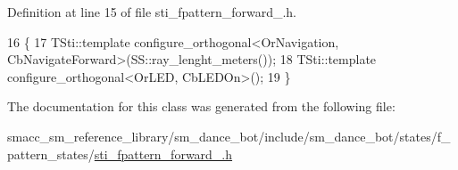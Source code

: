 Definition at line 15 of file sti\+\_\+fpattern\+\_\+forward\+\_.\+h.


\begin{DoxyCode}
16   \{
17      TSti::template configure\_orthogonal<OrNavigation, CbNavigateForward>(SS::ray\_lenght\_meters());
18      TSti::template configure\_orthogonal<OrLED, CbLEDOn>();
19   \}
\end{DoxyCode}


The documentation for this class was generated from the following file\+:\begin{DoxyCompactItemize}
\item 
smacc\+\_\+sm\+\_\+reference\+\_\+library/sm\+\_\+dance\+\_\+bot/include/sm\+\_\+dance\+\_\+bot/states/f\+\_\+pattern\+\_\+states/\hyperlink{sti__fpattern__forward__1_8h}{sti\+\_\+fpattern\+\_\+forward\+\_.\+h}\end{DoxyCompactItemize}
